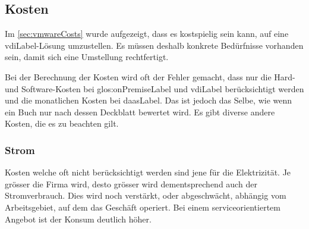 \subsection{Kosten}

Im \cref{sec:vmwareCosts} wurde aufgezeigt, dass es kostspielig sein kann, auf eine \Gls{vdiLabel}-Lösung umzustellen. Es müssen deshalb konkrete Bedürfnisse vorhanden sein, damit sich eine Umstellung rechtfertigt.

Bei der Berechnung der Kosten wird oft der Fehler gemacht, dass nur die Hard- und Software-Kosten bei \gls{glos:onPremiseLabel} und \Gls{vdiLabel} berücksichtigt werden und die monatlichen Kosten bei \Gls{daasLabel}.
Das ist jedoch das Selbe, wie wenn ein Buch nur nach dessen Deckblatt bewertet wird.
Es gibt diverse andere Kosten, die es zu beachten gilt.

\subsubsection{Strom}
Kosten welche oft nicht berücksichtigt werden sind jene für die Elektrizität.
Je grösser die Firma wird, desto grösser wird dementsprechend auch der Stromverbrauch. Dies wird noch verstärkt, oder abgeschwächt, abhängig vom Arbeitsgebiet, auf dem das Geschäft operiert. Bei einem serviceorientiertem Angebot ist der Konsum deutlich höher.

